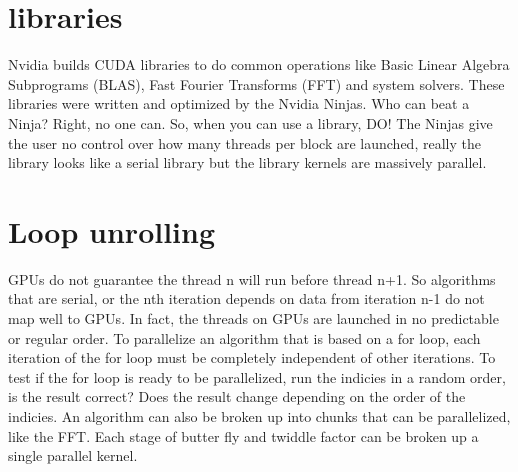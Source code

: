 \section{libraries}
	Nvidia builds CUDA libraries to do common operations like Basic Linear Algebra Subprograms (BLAS), Fast Fourier Transforms (FFT) and system solvers. These libraries were written and optimized by the Nvidia Ninjas. Who can beat a Ninja? Right, no one can. So, when you can use a library, DO!
	The Ninjas give the user no control over how many threads per block are launched, really the library looks like a serial library but the library kernels are massively parallel.

\section{Loop unrolling}
	GPUs do not guarantee the thread n will run before thread n+1. So algorithms that are serial, or the nth iteration depends on data from iteration n-1 do not map well to GPUs. In fact, the threads on GPUs are launched in no predictable or regular order.
	To parallelize an algorithm that is based on a for loop, each iteration of the for loop must be completely independent of other iterations. To test if the for loop is ready to be parallelized, run the indicies in a random order, is the result correct? Does the result change depending on the order of the indicies.
	An algorithm can also be broken up into chunks that can be parallelized, like the FFT. Each stage of butter fly and twiddle factor can be broken up a single parallel kernel. 



